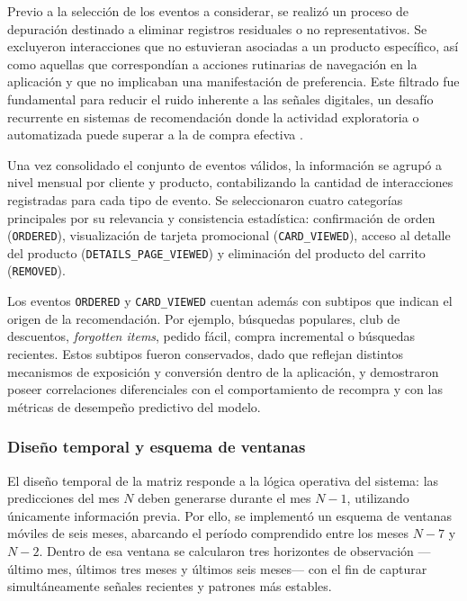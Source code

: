 Previo a la selección de los eventos a considerar, se realizó un proceso de depuración destinado a eliminar registros residuales o no representativos. Se excluyeron interacciones que no estuvieran asociadas a un producto específico, así como aquellas que correspondían a acciones rutinarias de navegación en la aplicación y que no implicaban una manifestación de preferencia. Este filtrado fue fundamental para reducir el ruido inherente a las señales digitales, un desafío recurrente en sistemas de recomendación donde la actividad exploratoria o automatizada puede superar a la de compra efectiva \cite{BOOK:Ricci2015, ARTICLE:Zhang2019}.

Una vez consolidado el conjunto de eventos válidos, la información se agrupó a nivel mensual por cliente y producto, contabilizando la cantidad de interacciones registradas para cada tipo de evento. Se seleccionaron cuatro categorías principales por su relevancia y consistencia estadística: confirmación de orden (\texttt{ORDERED}), visualización de tarjeta promocional (\texttt{CARD\_VIEWED}), acceso al detalle del producto (\texttt{DETAILS\_PAGE\_VIEWED}) y eliminación del producto del carrito (\texttt{REMOVED}).

Los eventos \texttt{ORDERED} y \texttt{CARD\_VIEWED} cuentan además con subtipos que indican el origen de la recomendación. Por ejemplo, búsquedas populares, club de descuentos, \textit{forgotten items}, pedido fácil, compra incremental o búsquedas recientes. Estos subtipos fueron conservados, dado que reflejan distintos mecanismos de exposición y conversión dentro de la aplicación, y demostraron poseer correlaciones diferenciales con el comportamiento de recompra y con las métricas de desempeño predictivo del modelo.

\subsubsection{Diseño temporal y esquema de ventanas}

El diseño temporal de la matriz responde a la lógica operativa del sistema: las predicciones del mes $N$ deben generarse durante el mes $N-1$, utilizando únicamente información previa. Por ello, se implementó un esquema de ventanas móviles de seis meses, abarcando el período comprendido entre los meses $N-7$ y $N-2$. Dentro de esa ventana se calcularon tres horizontes de observación —último mes, últimos tres meses y últimos seis meses— con el fin de capturar simultáneamente señales recientes y patrones más estables.

